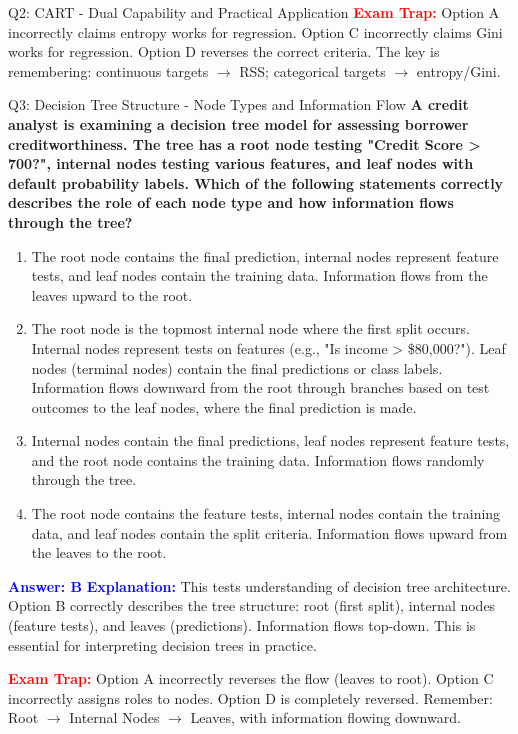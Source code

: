 \documentclass[8pt]{beamer}
\begin{document}
\begin{frame}{Q2: CART - Dual Capability and Practical Application}
		\textcolor{red}{\textbf{Exam Trap:}} Option A incorrectly claims entropy works for regression. Option C incorrectly claims Gini works for regression. Option D reverses the correct criteria. The key is remembering: continuous targets $\rightarrow$ RSS; categorical targets $\rightarrow$ entropy/Gini.
	\end{frame}
	
	\begin{frame}{Q3: Decision Tree Structure - Node Types and Information Flow}
		\fontsize{6.5}{7.5}\selectfont
		\textbf{A credit analyst is examining a decision tree model for assessing borrower creditworthiness. The tree has a root node testing "Credit Score > 700?", internal nodes testing various features, and leaf nodes with default probability labels. Which of the following statements correctly describes the role of each node type and how information flows through the tree?}
		
		\begin{enumerate}
			\item The root node contains the final prediction, internal nodes represent feature tests, and leaf nodes contain the training data. Information flows from the leaves upward to the root.
			\item The root node is the topmost internal node where the first split occurs. Internal nodes represent tests on features (e.g., "Is income > \$80,000?"). Leaf nodes (terminal nodes) contain the final predictions or class labels. Information flows downward from the root through branches based on test outcomes to the leaf nodes, where the final prediction is made.
			\item Internal nodes contain the final predictions, leaf nodes represent feature tests, and the root node contains the training data. Information flows randomly through the tree.
			\item The root node contains the feature tests, internal nodes contain the training data, and leaf nodes contain the split criteria. Information flows upward from the leaves to the root.
		\end{enumerate}
		
		\vspace{0.1cm}
		\textcolor{blue}{\textbf{Answer: B}}
		\vspace{0.1cm}
		\textcolor{blue}{\textbf{Explanation:}} This tests understanding of decision tree architecture. Option B correctly describes the tree structure: root (first split), internal nodes (feature tests), and leaves (predictions). Information flows top-down. This is essential for interpreting decision trees in practice.
		
		\textcolor{red}{\textbf{Exam Trap:}} Option A incorrectly reverses the flow (leaves to root). Option C incorrectly assigns roles to nodes. Option D is completely reversed. Remember: Root $\rightarrow$ Internal Nodes $\rightarrow$ Leaves, with information flowing downward.
	\end{frame}
	
\end{document}

